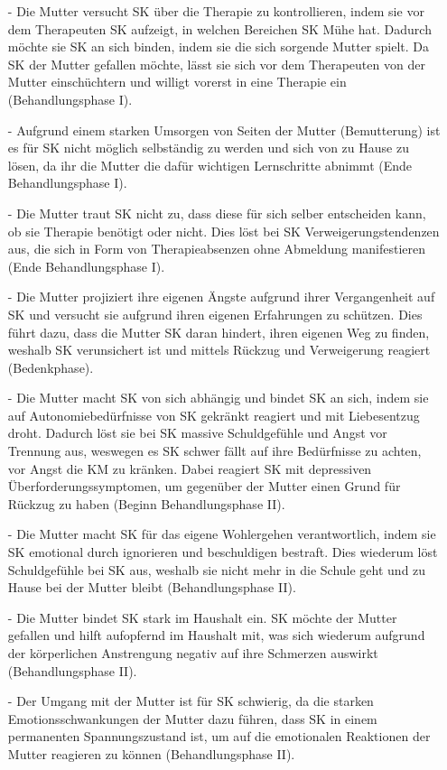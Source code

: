 \begin{itemize}
 \item [-]Die Mutter versucht SK über die Therapie zu kontrollieren, indem sie vor dem Therapeuten SK aufzeigt, in welchen Bereichen SK Mühe hat. Dadurch möchte sie SK an sich binden, indem sie die sich sorgende Mutter spielt. Da SK der Mutter gefallen möchte, lässt sie sich vor dem Therapeuten von der Mutter einschüchtern und willigt vorerst in eine Therapie ein (Behandlungsphase I). 
 \item [-]Aufgrund einem starken Umsorgen von Seiten der Mutter (Bemutterung) ist es für SK nicht möglich selbständig zu werden und sich von zu Hause zu lösen, da ihr die Mutter die dafür wichtigen Lernschritte abnimmt (Ende Behandlungsphase I). 
 \item [-]Die Mutter traut SK nicht zu, dass diese für sich selber entscheiden kann, ob sie Therapie benötigt oder nicht. Dies löst bei SK Verweigerungstendenzen aus, die sich in Form von Therapieabsenzen ohne Abmeldung manifestieren (Ende Behandlungsphase I). 
 \item [-] Die Mutter projiziert ihre eigenen Ängste aufgrund ihrer Vergangenheit auf SK und versucht sie aufgrund ihren eigenen Erfahrungen zu schützen. Dies führt dazu, dass die Mutter SK daran hindert, ihren eigenen Weg zu finden, weshalb SK verunsichert ist und mittels Rückzug und Verweigerung reagiert (Bedenkphase). 
 \item [-] Die Mutter macht SK von sich abhängig und bindet SK an sich, indem sie auf Autonomiebedürfnisse von SK gekränkt reagiert und mit Liebesentzug droht. Dadurch löst sie bei SK massive Schuldgefühle und Angst vor Trennung aus, weswegen es SK schwer fällt auf ihre Bedürfnisse zu achten, vor Angst die KM zu kränken. Dabei reagiert SK mit depressiven Überforderungssymptomen, um gegenüber der Mutter einen Grund für Rückzug zu haben (Beginn Behandlungsphase II). 
 \item [-] Die Mutter macht SK für das eigene Wohlergehen verantwortlich, indem sie SK emotional durch ignorieren und beschuldigen bestraft. Dies wiederum löst Schuldgefühle bei SK aus, weshalb sie nicht mehr in die Schule geht und zu Hause bei der Mutter bleibt (Behandlungsphase II). 
 \item [-] Die Mutter bindet SK stark im Haushalt ein. SK möchte der Mutter gefallen und hilft aufopfernd im Haushalt mit, was sich wiederum aufgrund der körperlichen Anstrengung negativ auf ihre Schmerzen auswirkt (Behandlungsphase II).
 \item [-] Der Umgang mit der Mutter ist für SK schwierig, da die starken Emotionsschwankungen der Mutter dazu führen, dass SK in einem permanenten Spannungszustand ist, um auf die emotionalen Reaktionen der Mutter reagieren zu können (Behandlungsphase II). 

\end{itemize}
